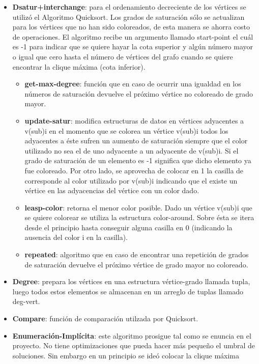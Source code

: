 \documentclass[a4paper,10pt]{article}
\begin{document}
\begin{itemize}
 \item \textbf{Dsatur+interchange}: para el ordenamiento decreciente de los vértices se utilizó el Algoritmo Quicksort. Los 
grados de saturación sólo se actualizan para los vértices que no han sido coloreados, de esta manera se ahorra costo 
de operaciones. El algoritmo recibe un argumento llamado start-point el cuál es -1 para indicar que se quiere hayar 
la cota superior y algún número mayor o igual que cero hasta el número de vértices del grafo cuando se quiere encontrar 
la clique máxima (cota inferior). 
\begin{itemize}
 \item \textbf{get-max-degree}: función que en caso de ocurrir una igualdad en los números de saturación devuelve el próximo
vértice no coloreado de grado mayor.
\item \textbf{update-satur}: modifica estructuras de datos en vértices adyacentes a v(sub)i en el momento que se colorea un vértice v(sub)i todos los adyacentes a éste sufren un aumento 
de saturación siempre que el color utilizado no sea el de uno adyacente a un adyacente de v(sub)i. Si el grado 
de saturación de un elemento es -1 significa que dicho elemento ya fue coloreado. Por otro lado, se aprovecha de 
colocar en 1 la casilla de corresponde al color utilizado por v(sub)i indicando que el existe un vértice en las adyacencias del vértice con un color dado.
 \item \textbf{leasp-color}: retorna el menor color posible. Dado un vértice v(sub)i que se quiere colorear se utiliza la estructura color-around. Sobre ésta se itera desde el principio hasta conseguir alguna casilla en 0 (indicando la ausencia del color i en la casilla).
\item \textbf{repeated}: algoritmo que en caso de encontrar una repetición de grados de saturación devuelve el próximo vértice de grado mayor no coloreado.
\end{itemize}
\item \textbf{Degree}: prepara los vértices en una estructura vértice-grado llamada tupla, luego todos estos elementos se almacenan en un arreglo de tuplas llamado deg-vert.
\item \textbf{Compare}: función de comparación utilzada por Quicksort.
 \item \textbf{Enumeración-Implícita}: este algoritmo prosigue tal como se enuncia en el proyecto. No tiene optimizaciones 
  que pueda hacer más pequeño el umbral de soluciones. Sin embargo en un principio se ideó colocar la clique máxima 

\end{itemize}
\end{document}
